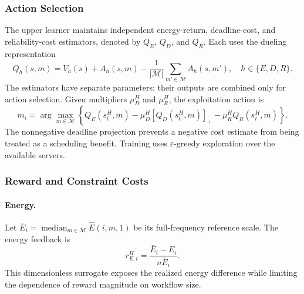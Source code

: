 \documentclass[10pt,twocolumn]{article}
\begin{document}
\subsubsection{Action Selection}

The upper learner maintains independent energy-return, deadline-cost,
and reliability-cost estimators, denoted by $Q_E$, $Q_D$, and $Q_R$.
Each uses the dueling representation~\cite{wang2016dueling}
\begin{equation}
 Q_h(s,m)=V_h(s)+A_h(s,m)
 -\frac{1}{|\mathcal M|}\sum_{m'\in\mathcal M}A_h(s,m'),
 \quad h\in\{E,D,R\}.
 \label{eq:method_dueling}
\end{equation}
The estimators have separate parameters; their outputs are combined
only for action selection. Given multipliers $\mu_D^H$ and $\mu_R^H$,
the exploitation action is
\begin{equation}
 m_i=\arg\max_{m\in\mathcal M}
 \left\{Q_E(s_t^H,m)-\mu_D^H[Q_D(s_t^H,m)]_+
 -\mu_R^H Q_R(s_t^H,m)\right\}.
 \label{eq:method_high_action}
\end{equation}
The nonnegative deadline projection prevents a negative cost estimate
from being treated as a scheduling benefit. Training uses
$\varepsilon$-greedy exploration over the available servers.

\subsubsection{Reward and Constraint Costs}

\paragraph{Energy.}
Let $\bar E_i=\operatorname{median}_{m\in\mathcal M}
\widehat E(i,m,1)$ be its full-frequency reference scale. The energy feedback is
\begin{equation}
 r_{E,t}^H=\frac{\bar E_i-E_i}{n\bar E_i}.
 \label{eq:method_high_energy}
\end{equation}
This dimensionless surrogate exposes the realized energy difference
while limiting the dependence of reward magnitude on workflow size.
\end{document}
